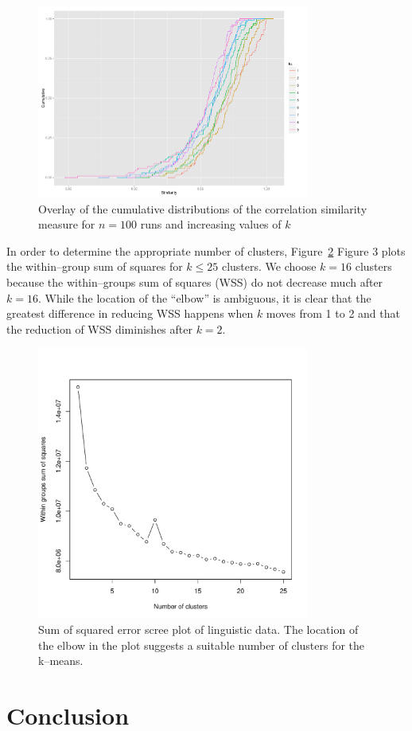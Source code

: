 \documentclass[10pt,twocolumn,letterpaper]{article}
\begin{document}
\begin{figure}[htbp] 
   \centering
   \includegraphics[width=0.8\textwidth]{./figure/cumulative_similarity.pdf}
   \caption{Overlay of the cumulative distributions of the correlation similarity measure for $n=100$ runs and increasing values of $k$}
   \label{fig:cumulative_similarity}
\end{figure}

In order to determine the appropriate number of clusters, Figure~\ref{fig:scree_plot} Figure 3 plots the within--group sum of squares for $k \leq 25$ clusters. We choose $k=16$ clusters because the within--groups sum of squares (WSS) do not decrease much after $k=16$. While the location of the ``elbow''  is ambiguous, it is clear that the greatest difference in reducing WSS happens when $k$ moves from 1 to 2 and that the reduction of WSS diminishes after $k=2$. 

\begin{figure}[htbp] 
   \centering
   \includegraphics[width=0.8\textwidth]{./figure/scree_plot.pdf}
   \caption{Sum of squared error scree plot of linguistic data. The location of the elbow in the plot suggests a suitable number of clusters for the k--means.}
   \label{fig:scree_plot}
\end{figure}

\section{Conclusion} \label{section:Con}



{\small


}
\end{document}
